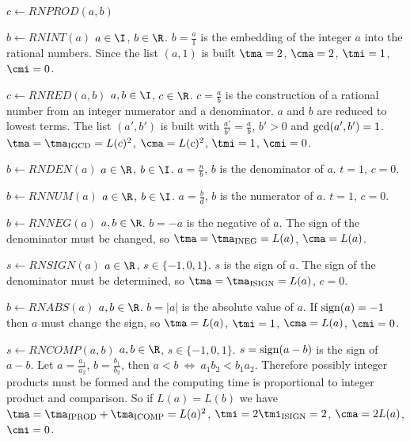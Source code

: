 \begin{deflist}{$c \gets RNPROD(a,b)$}
\item[$b \gets RNINT(a)$] $a \in \I$, $b \in \R$. 
     $b = \frac{a}{1}$ is the embedding of 
     the integer $a$ into the rational numbers. 
     Since the list $(a,1)$ is built
     $\tma = 2$, $\cma = 2$, $\tmi = 1$, $\cmi = 0$.
\item[$c \gets RNRED(a,b)$] $a, b \in \I$, $c \in \R$. 
     $c = \frac{a}{b}$ is the construction of a rational number
     from an integer numerator and a denominator.
     $a$ and $b$ are reduced to lowest terms.
     The list $(a',b')$ is built
     with $\frac{a'}{b'} = \frac{a}{b}$, $b' > 0$ 
     and ${\rm gcd}(a',b') = 1$.
     $\tma = \tma_{{\rm IGCD}} = L(c)^2$, $\cma = L(c)^2$, 
     $\tmi = 1$, $\cmi = 0$.
\item[$b \gets RNDEN(a)$] $a \in \R$, $b \in \I$. 
     $a = \frac{n}{b}$, $b$ is the denominator of $a$.
     $t = 1$, $c = 0$.
\item[$b \gets RNNUM(a)$] $a \in \R$, $b \in \I$. 
     $a = \frac{b}{d}$, $b$ is the numerator of $a$.
     $t = 1$, $c = 0$.
\item[$b \gets RNNEG(a)$] $a, b \in \R$. 
     $b = -a$ is the negative of $a$. 
     The sign of the denominator must be changed, so
     $\tma = \tma_{{\rm INEG}} = L(a)$, $\cma = L(a)$.
\item[$s \gets RNSIGN(a)$] $a \in \R$, $s \in \{ -1, 0, 1 \}$. 
     $s$ is the sign of $a$. 
     The sign of the denominator must be determined, so
     $\tma = \tma_{{\rm ISIGN}} = L(a)$, $c = 0$.
\item[$b \gets RNABS(a)$] $a, b \in \R$. 
     $b = \vert a \vert$ is the absolute value of $a$. 
     If ${\rm sign}(a) = -1$ then $a$ must change the sign, so
     $\tma = L(a)$, $\tmi = 1$, $\cma = L(a)$, $\cmi = 0$.
\item[$s \gets RNCOMP(a,b)$] $a, b \in \R$, $s \in \{ -1, 0, 1 \}$. 
     $s = {\rm sign}(a-b)$ is the sign of $a-b$. 
     Let $a = \frac{a_1}{a_2}$, $b = \frac{b_1}{b_2}$,
     then $ a < b \ \Longleftrightarrow \ a_1 b_2 < b_1 a_2$.
     Therefore possibly integer products must be formed and
     the computing time is proportional to integer product and 
     comparison. 
     So if $L(a) = L(b)$ we have 
     $\tma = \tma_{{\rm IPROD}} + \tma_{{\rm ICOMP}} = L(a)^2$, 
     $\tmi = 2 \tmi_{{\rm ISIGN}} = 2$, $\cma = 2 L(a)$, $\cmi = 0$. 

\end{deflist}
